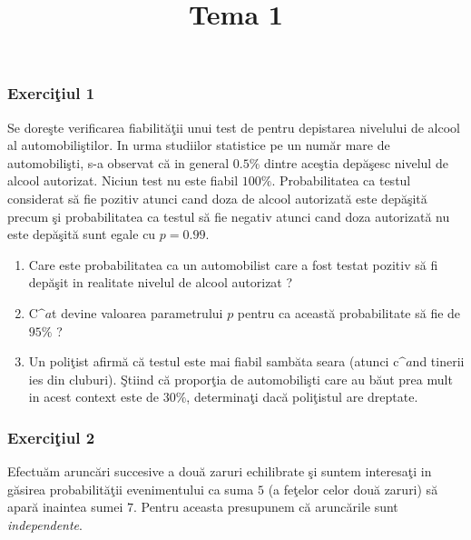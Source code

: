 \documentclass[]{article}
\title{Tema 1}
\author{}
\date{}
\begin{document}
\maketitle

\thispagestyle{fancy}

\subsubsection{\texorpdfstring{Exerci\c tiul
1}{Exerciiul 1}}\label{exerciiul-1}

Se dore\c ste verificarea fiabilit\u a\c tii unui test de pentru
depistarea nivelului de alcool al automobili\c stilor. In urma studiilor
statistice pe un num\u ar mare de automobili\c sti, s-a observat c\u a
in general \(0.5\%\) dintre ace\c stia dep\u a\c sesc nivelul de alcool
autorizat. Niciun test nu este fiabil \(100\%\). Probabilitatea ca
testul considerat s\u a fie pozitiv atunci cand doza de alcool
autorizat\u a este dep\u a\c sit\u a precum \c si probabilitatea ca
testul s\u a fie negativ atunci cand doza autorizat\u a nu este
dep\u a\c sit\u a sunt egale cu \(p=0.99\).

\begin{enumerate}
\def\labelenumi{\arabic{enumi}.}
\item
  Care este probabilitatea ca un automobilist care a fost testat pozitiv
  s\u a fi dep\u a\c sit in realitate nivelul de alcool autorizat ?
\item
  C\(\^a\)t devine valoarea parametrului \(p\) pentru ca aceast\u a
  probabilitate s\u a fie de \(95\%\) ?
\item
  Un poli\c tist afirm\u a c\u a testul este mai fiabil samb\u ata seara
  (atunci c\(\^a\)nd tinerii ies din cluburi). \c Stiind c\u a
  propor\c tia de automobili\c sti care au b\u aut prea mult in acest
  context este de \(30\%\), determina\c ti dac\u a poli\c tistul are
  dreptate.
\end{enumerate}

\subsubsection{\texorpdfstring{Exerci\c tiul
2}{Exerciiul 2}}\label{exerciiul-2}

Efectu\u am arunc\u ari succesive a dou\u a zaruri echilibrate \c si
suntem interesa\c ti in g\u asirea probabilit\u a\c tii evenimentului ca
suma \(5\) (a fe\c telor celor dou\u a zaruri) s\u a apar\u a inaintea
sumei \(7\). Pentru aceasta presupunem c\u a arunc\u arile sunt
\emph{independente}.
\end{document}
